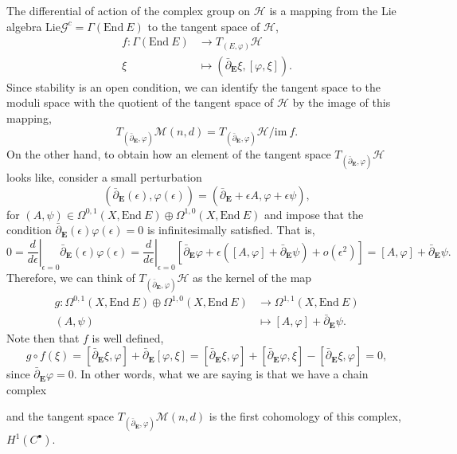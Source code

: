 \documentclass[12pt,a4paper]{book}
\theoremstyle{definition} \newtheorem{defn}[thm]{Definition}
\theoremstyle{definition} \newtheorem{ejemplo}[thm]{Example}
\theoremstyle{remark} \newtheorem{rem}[thm]{Remark}
\def\HH{\mathscr{H}}
\def\GG{\mathscr{G}}
\def\im{\mathrm{im}\ }
\def\Lie{\mathrm{Lie}}
\def\End{\mathrm{End}}
\def\Hig{\mathscr{M}}
\def\delbar{\bar{\partial}}
\newcommand{\ve}[1]{\mathbf{#1}}
\begin{document}
	    The differential of action of the complex group on $\HH$ is a mapping from the Lie algebra $\Lie \GG^c= \Gamma(\End\ E)$ to the tangent space of $\HH$,
	    \begin{align*}
	      f:\Gamma(\End\ E)&\longrightarrow T_{(E,\varphi)}\HH\\ 
	      \xi &\longmapsto (\delbar_{\ve{E}} \xi, [\varphi,\xi]). 
	      \end{align*}
	      Since stability is an open condition, we can identify the tangent space to the moduli space with the quotient of the tangent space of $\HH$ by the image of this mapping, $$T_{(\delbar_{\ve{E}},\varphi)}\Hig(n,d)=T_{(\delbar_{\ve{E}},\varphi)}\HH/\im f.$$ On the other hand, to obtain how an element of the tangent space $T_{(\delbar_{\ve{E}},\varphi)}\HH$ looks like, consider a small perturbation $$(\delbar_{\ve{E}}(\epsilon), \varphi(\epsilon))=(\delbar_{\ve{E}}+\epsilon A, \varphi + \epsilon \psi),$$ for $(A,\psi) \in \Omega^{0,1}(X,\End \ E) \oplus \Omega^{1,0}(X, \End \ E)$ and impose that the condition $\delbar_{\ve{E}}(\epsilon)\varphi(\epsilon)=0$ is infinitesimally satisfied. That is,
	    \begin{equation*}
	      0=\left.\frac{d}{d\epsilon} \right|_{\epsilon=0} \delbar_{\ve{E}}(\epsilon)\varphi(\epsilon)=\left.\frac{d}{d\epsilon} \right|_{\epsilon=0}\left[ \delbar_{\ve{E}} \varphi + \epsilon\left( [A,\varphi]+\delbar_{\ve{E}}\psi \right)+ o(\epsilon^2) \right] = [A,\varphi]+\delbar_{\ve{E}}\psi.
	    \end{equation*}
	    Therefore, we can think of $T_{(\delbar_{\ve{E}},\varphi)}\HH$ as the kernel of the map
	    \begin{align*}
	      g :\Omega^{0,1}(X,\End \ E) \oplus \Omega^{1,0}(X, \End \ E)&\longrightarrow \Omega^{1,1}(X, \End\ E)\\ 
	      (A,\psi) &\longmapsto [A,\varphi]+\delbar_{\ve{E}}\psi. 
	      \end{align*}
	      Note then that $f$ is well defined,
	      \begin{equation*}
		g\circ f(\xi)=[\delbar_{\ve{E}}\xi,\varphi]+\delbar_{\ve{E}}[\varphi,\xi]=[\delbar_{\ve{E}}\xi,\varphi]+[\delbar_{\ve{E}}\varphi,\xi]-[\delbar_{\ve{E}}\xi,\varphi]=0,
	      \end{equation*}
	      since $\delbar_{\ve{E}}\varphi=0$. In other words, what we are saying is that we have a chain complex
	      \begin{center}
	      \end{center}
	      and the tangent space $T_{(\delbar_{\ve{E}},\varphi)}\Hig(n,d)$ is the first cohomology of this complex, $H^1(C^\bullet)$.
\end{document}
